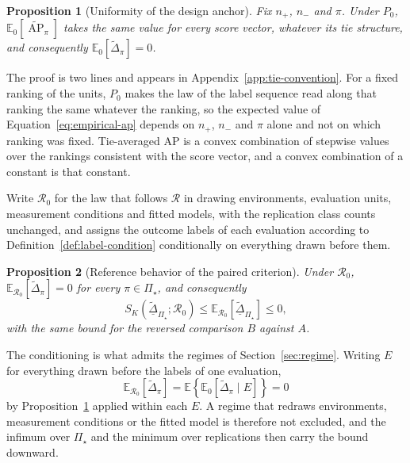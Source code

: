 \documentclass[11pt]{article}
\newcommand{\AP}{\operatorname{AP}}
\newcommand{\Regime}{\mathcal{R}}
\newcommand{\PSet}{\Pi_\star}
\newcommand{\E}{\mathbb{E}}
\newcommand{\APta}{\widetilde{\AP}}
\newcommand{\Dta}{\widetilde{\Delta}}
\newcommand{\RobDta}{\underline{\widetilde{\Delta}}_{\PSet}}
\newtheorem{proposition}{Proposition}
\theoremstyle{remark}
\begin{document}
\begin{proposition}[Uniformity of the design anchor]
\label{prop:uniformity}
Fix $n_+$, $n_-$ and $\pi$. Under $P_0$, $\E_0[\APta_\pi]$ takes the same value for every score vector, whatever its tie structure, and consequently $\E_0[\Dta_\pi]=0$.
\end{proposition}

The proof is two lines and appears in Appendix~\ref{app:tie-convention}. For a fixed ranking of the units, $P_0$ makes the law of the label sequence read along that ranking the same whatever the ranking, so the expected value of Equation~\eqref{eq:empirical-ap} depends on $n_+$, $n_-$ and $\pi$ alone and not on which ranking was fixed. Tie-averaged AP is a convex combination of stepwise values over the rankings consistent with the score vector, and a convex combination of a constant is that constant.

Write $\Regime_0$ for the law that follows $\Regime$ in drawing environments, evaluation units, measurement conditions and fitted models, with the replication class counts unchanged, and assigns the outcome labels of each evaluation according to Definition~\ref{def:label-condition} conditionally on everything drawn before them.

\begin{proposition}[Reference behavior of the paired criterion]
\label{prop:conservative}
Under $\Regime_0$, $\E_{\Regime_0}[\Dta_\pi]=0$ for every $\pi\in\PSet$, and consequently
\[
S_K(\RobDta;\Regime_0)
\leq
\E_{\Regime_0}[\RobDta]
\leq
0 ,
\]
with the same bound for the reversed comparison $B$ against $A$.
\end{proposition}

The conditioning is what admits the regimes of Section~\ref{sec:regime}. Writing $E$ for everything drawn before the labels of one evaluation,
\[
\E_{\Regime_0}\left[\Dta_\pi\right]
=
\E\left\{
\E_0\left[\Dta_\pi\mid E\right]
\right\}
=
0
\]
by Proposition~\ref{prop:uniformity} applied within each $E$. A regime that redraws environments, measurement conditions or the fitted model is therefore not excluded, and the infimum over $\PSet$ and the minimum over replications then carry the bound downward.
\end{document}
